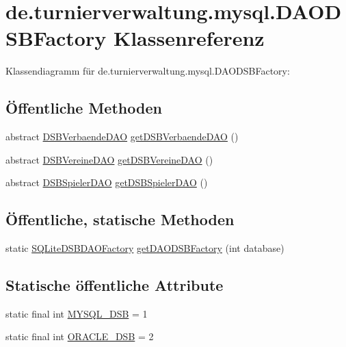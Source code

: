 \hypertarget{classde_1_1turnierverwaltung_1_1mysql_1_1_d_a_o_d_s_b_factory}{}\section{de.\+turnierverwaltung.\+mysql.\+D\+A\+O\+D\+S\+B\+Factory Klassenreferenz}
\label{classde_1_1turnierverwaltung_1_1mysql_1_1_d_a_o_d_s_b_factory}


Klassendiagramm für de.\+turnierverwaltung.\+mysql.\+D\+A\+O\+D\+S\+B\+Factory\+:
\subsection*{Öffentliche Methoden}
\begin{DoxyCompactItemize}
\item 
abstract \hyperlink{interfacede_1_1turnierverwaltung_1_1mysql_1_1_d_s_b_verbaende_d_a_o}{D\+S\+B\+Verbaende\+D\+AO} \hyperlink{classde_1_1turnierverwaltung_1_1mysql_1_1_d_a_o_d_s_b_factory_a8abfa0c0142e9d043f24214b3fc1a99e}{get\+D\+S\+B\+Verbaende\+D\+AO} ()
\item 
abstract \hyperlink{interfacede_1_1turnierverwaltung_1_1mysql_1_1_d_s_b_vereine_d_a_o}{D\+S\+B\+Vereine\+D\+AO} \hyperlink{classde_1_1turnierverwaltung_1_1mysql_1_1_d_a_o_d_s_b_factory_a6bf82c0423681a942d8943ca8cfd39ff}{get\+D\+S\+B\+Vereine\+D\+AO} ()
\item 
abstract \hyperlink{interfacede_1_1turnierverwaltung_1_1mysql_1_1_d_s_b_spieler_d_a_o}{D\+S\+B\+Spieler\+D\+AO} \hyperlink{classde_1_1turnierverwaltung_1_1mysql_1_1_d_a_o_d_s_b_factory_a95e28dda5456e46fd0ec7074327bb846}{get\+D\+S\+B\+Spieler\+D\+AO} ()
\end{DoxyCompactItemize}
\subsection*{Öffentliche, statische Methoden}
\begin{DoxyCompactItemize}
\item 
static \hyperlink{classde_1_1turnierverwaltung_1_1mysql_1_1_s_q_lite_d_s_b_d_a_o_factory}{S\+Q\+Lite\+D\+S\+B\+D\+A\+O\+Factory} \hyperlink{classde_1_1turnierverwaltung_1_1mysql_1_1_d_a_o_d_s_b_factory_a96946140940c2132bed4f4a4b92581ae}{get\+D\+A\+O\+D\+S\+B\+Factory} (int database)
\end{DoxyCompactItemize}
\subsection*{Statische öffentliche Attribute}
\begin{DoxyCompactItemize}
\item 
static final int \hyperlink{classde_1_1turnierverwaltung_1_1mysql_1_1_d_a_o_d_s_b_factory_a2e8a98a93ca2dac660edef6f2d70989e}{M\+Y\+S\+Q\+L\+\_\+\+D\+SB} = 1
\item 
static final int \hyperlink{classde_1_1turnierverwaltung_1_1mysql_1_1_d_a_o_d_s_b_factory_aa1ebf5855f35a1759227b4b26cee98b2}{O\+R\+A\+C\+L\+E\+\_\+\+D\+SB} = 2
\end{DoxyCompactItemize}


